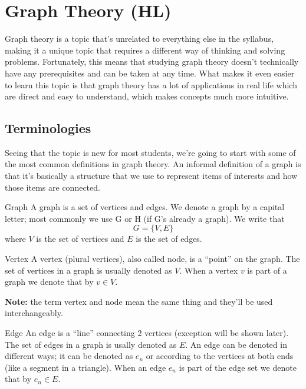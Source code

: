 \documentclass[../../main.tex]{subfiles}
\begin{document}
\chapter{Graph Theory (HL)}

Graph theory is a topic that's unrelated to everything else in the syllabus, making it a unique topic that requires a different way of thinking and solving problems.
Fortunately, this means that studying graph theory doesn't technically have any prerequisites and can be taken at any time.
What makes it even easier to learn this topic is that graph theory has a lot of applications in real life which are direct and easy to understand, which makes concepts much more intuitive.

\section{Terminologies}
Seeing that the topic is new for most students, we're going to start with some of the most common definitions in graph theory.
An informal definition of a graph is that it's basically a structure that we use to represent items of interests and how those items are connected.

\begin{definition}{Graph}
A graph is a set of vertices and edges.
We denote a graph by a capital letter; most commonly we use G or H (if G's already a graph).
We write that
\begin{equation}
    G = \{V, E\}
\end{equation}
where $V$ is the set of vertices and $E$ is the set of edges.
\end{definition}

\begin{definition}{Vertex}
A vertex (plural vertices), also called node, is a ``point'' on the graph.
The set of vertices in a graph is usually denoted as $V$.
When a vertex $v$ is part of a graph we denote that by $v \in V$.

\textbf{Note:} the term vertex and node mean the same thing and they'll be used interchangeably.
\end{definition}

\begin{definition}{Edge}
An edge is a ``line'' connecting 2 vertices (exception will be shown later).
The set of edges in a graph is usally denoted as $E$.
An edge can be denoted in different ways; it can be denoted as $e_n$ or according to the vertices at both ends (like a segment in a triangle).
When an edge $e_n$ is part of the edge set we denote that by $e_n \in E$.
\end{definition}
\end{document}
